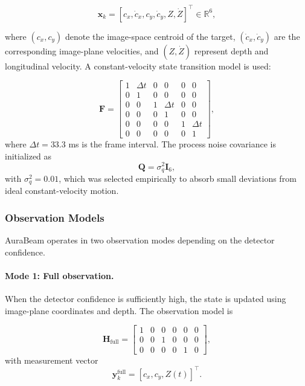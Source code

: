 \documentclass[pdflatex,sn-mathphys-num]{sn-jnl}%
\theoremstyle{thmstyleone}%
\theoremstyle{thmstyletwo}%
\theoremstyle{thmstylethree}%
\begin{document}
\begin{equation}
\mathbf{x}_k = [c_x, \dot{c}_x, c_y, \dot{c}_y, Z, \dot{Z}]^\top \in \mathbb{R}^6,
\label{eq:state}
\end{equation}

where $(c_x, c_y)$ denote the image-space centroid of the target, $(\dot{c}_x, \dot{c}_y)$ are the corresponding image-plane velocities, and $(Z, \dot{Z})$ represent depth and longitudinal velocity. A constant-velocity state transition model is used:

\begin{equation}
\mathbf{F} =
\begin{bmatrix}
1 & \Delta t & 0 & 0 & 0 & 0 \\
0 & 1 & 0 & 0 & 0 & 0 \\
0 & 0 & 1 & \Delta t & 0 & 0 \\
0 & 0 & 0 & 1 & 0 & 0 \\
0 & 0 & 0 & 0 & 1 & \Delta t \\
0 & 0 & 0 & 0 & 0 & 1
\end{bmatrix},
\label{eq:F_matrix}
\end{equation}
where $\Delta t = 33.3$ ms is the frame interval. The process noise covariance is initialized as
\begin{equation}
\mathbf{Q} = \sigma_q^2 \mathbf{I}_6,
\label{eq:Q_matrix}
\end{equation}
with $\sigma_q^2 = 0.01$, which was selected empirically to absorb small deviations from ideal constant-velocity motion.

\subsubsection{Observation Models}

AuraBeam operates in two observation modes depending on the detector confidence.

\paragraph{Mode 1: Full observation.}
When the detector confidence is sufficiently high, the state is updated using image-plane coordinates and depth. The observation model is

\begin{equation}
\mathbf{H}_{\mathrm{full}} =
\begin{bmatrix}
1 & 0 & 0 & 0 & 0 & 0 \\
0 & 0 & 1 & 0 & 0 & 0 \\
0 & 0 & 0 & 0 & 1 & 0
\end{bmatrix},
\label{eq:H_full}
\end{equation}
with measurement vector
\begin{equation}
\mathbf{y}_k^{\mathrm{full}} = [c_x, c_y, Z(t)]^\top.
\label{eq:y_full}
\end{equation}
\end{document}
